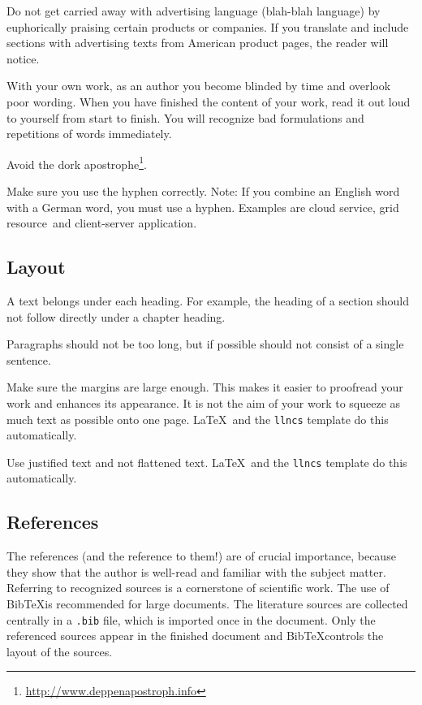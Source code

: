 \documentclass{llncs}
\begin{document}
Do not get carried away with advertising language (\glqq blah-blah language\grqq) by euphorically praising certain products or companies. If you translate and include sections with advertising texts from American product pages, the reader will notice.

With your own work, as an author you become blinded by time and overlook poor wording. When you have finished the content of your work, read it out loud to yourself from start to finish. You will recognize bad formulations and repetitions of words immediately.

Avoid the dork apostrophe\footnote{\url{http://www.deppenapostroph.info}}.

Make sure you use the hyphen correctly. Note: If you combine an English word with a German word, you must use a hyphen. Examples are \glqq cloud service\grqq, \glqq grid resource\grqq\ and \glqq client-server application\grqq.

\subsection{Layout}

A text belongs under each heading. For example, the heading of a section should not follow directly under a chapter heading.

Paragraphs should not be too long, but if possible should not consist of a single sentence.

Make sure the margins are large enough. This makes it easier to proofread your work and enhances its appearance. It is not the aim of your work to squeeze as much text as possible onto one page. \LaTeX\ and the \texttt{llncs} template do this automatically.

Use justified text and not flattened text. \LaTeX\ and the \texttt{llncs} template do this automatically.

\subsection{References}

The references (and the reference to them!) are of crucial importance, because they show that the author is well-read and familiar with the subject matter. Referring to recognized sources is a cornerstone of scientific work. The use of Bib\TeX is recommended for large documents. The literature sources are collected centrally in a \verb!.bib! file, which is imported once in the document. Only the referenced sources appear in the finished document and Bib\TeX controls the layout of the sources.
\end{document}
